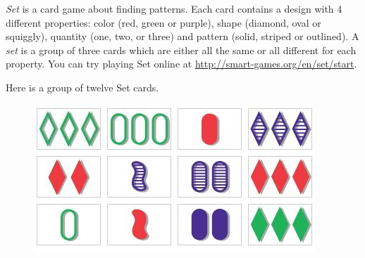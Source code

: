 \begin{problem} %
\emph{Set} is a card game about finding patterns.
Each card contains a design with 4 different properties: color (red, green or purple), shape (diamond, oval or squiggly), quantity (one, two, or three) and pattern (solid, striped or outlined).
A \emph{set} is a group of three cards which are either all the same or all different for each property.
You can try playing Set online at \url{http://smart-games.org/en/set/start}.

Here is a group of twelve Set cards.
\begin{figure}[H]
    \centering
    \includegraphics[width=.6\textwidth]{figures/set_game.jpg}
\end{figure}


\end{problem}
